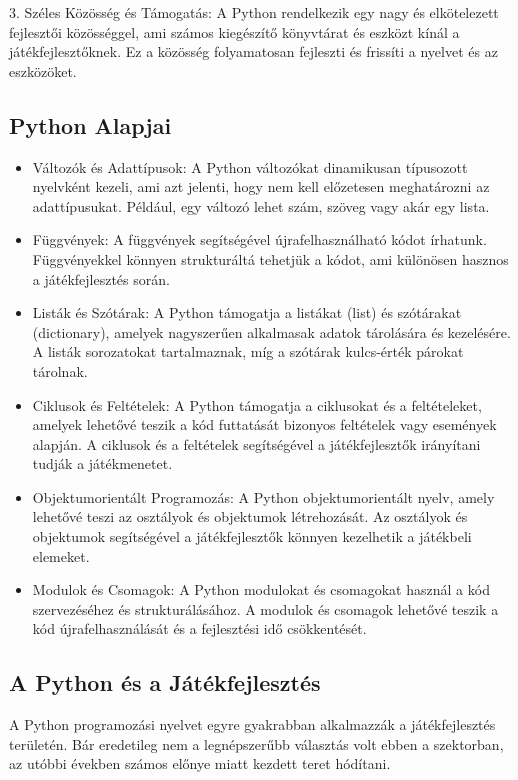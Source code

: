3. Széles Közösség és Támogatás:
A Python rendelkezik egy nagy és elkötelezett fejlesztői közösséggel, ami számos kiegészítő könyvtárat és eszközt kínál a játékfejlesztőknek. Ez a közösség folyamatosan fejleszti és frissíti a nyelvet és az eszközöket.

\subsection{Python Alapjai}
\begin{itemize}
\item Változók és Adattípusok:
A Python változókat dinamikusan típusozott nyelvként kezeli, ami azt jelenti, hogy nem kell előzetesen meghatározni az adattípusukat. Például, egy változó lehet szám, szöveg vagy akár egy lista.

\item Függvények:
A függvények segítségével újrafelhasználható kódot írhatunk. Függvényekkel könnyen strukturáltá tehetjük a kódot, ami különösen hasznos a játékfejlesztés során.

\item Listák és Szótárak:
A Python támogatja a listákat (list) és szótárakat (dictionary), amelyek nagyszerűen alkalmasak adatok tárolására és kezelésére. A listák sorozatokat tartalmaznak, míg a szótárak kulcs-érték párokat tárolnak.

\item Ciklusok és Feltételek:
A Python támogatja a ciklusokat és a feltételeket, amelyek lehetővé teszik a kód futtatását bizonyos feltételek vagy események alapján. A ciklusok és a feltételek segítségével a játékfejlesztők irányítani tudják a játékmenetet.

\item Objektumorientált Programozás:
A Python objektumorientált nyelv, amely lehetővé teszi az osztályok és objektumok létrehozását. Az osztályok és objektumok segítségével a játékfejlesztők könnyen kezelhetik a játékbeli elemeket.

\item Modulok és Csomagok:
A Python modulokat és csomagokat használ a kód szervezéséhez és strukturálásához. A modulok és csomagok lehetővé teszik a kód újrafelhasználását és a fejlesztési idő csökkentését.

\end{itemize}

\subsection{A Python és a Játékfejlesztés}
A Python programozási nyelvet egyre gyakrabban alkalmazzák a játékfejlesztés területén. Bár eredetileg nem a legnépszerűbb választás volt ebben a szektorban, az utóbbi években számos előnye miatt kezdett teret hódítani.

